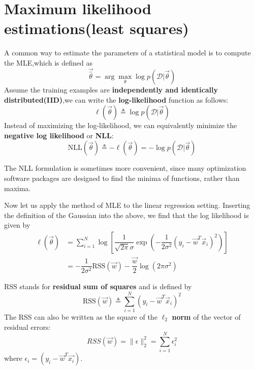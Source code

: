 \section{Maximum likelihood estimations(least squares)}
A common way to estimate the parameters of a statistical model is to compute the MLE,which is defined as
\begin{equation}
	\vec{\hat{\theta}}=\arg\max_\theta{\log p(\mathcal{D}|\vec{\theta})}
\end{equation}
Assume the training examples are \textbf{independently and identically distributed(IID)},we can write the \textbf{log-likelihood} function as follows:
\begin{equation}
\ell(\vec{\theta}) \triangleq \log p(\mathcal{D}|\vec{\theta})
\end{equation}
Instead of maximizing the log-likelihood, we can equivalently minimize the \textbf{negative log likelihood} or \textbf{NLL}:
\begin{equation}
\text{NLL}(\vec{\theta}) \triangleq -\ell(\vec{\theta})=-\log p(\mathcal{D}|\vec{\theta})
\end{equation}

The NLL formulation is sometimes more convenient, since many optimization software packages are designed to find the minima of functions, rather than maxima.

Now let us apply the method of MLE to the linear regression setting. Inserting the definition of the Gaussian into the above, we find that the log likelihood is given by
\begin{align}
\ell(\vec{\theta})& =\sum\limits_{i=1}^N \log\left[\dfrac{1}{\sqrt{2\pi}\sigma}\exp\left(-\dfrac{1}{2\sigma^2}(y_i-\vec{w}^T\vec{x}_i)^2\right)\right] \\
     & =-\dfrac{1}{2\sigma^2}\text{RSS}(\vec{w})-\dfrac{\vec{w}}{2}\log(2\pi\sigma^2)
\end{align}

RSS stands for \textbf{residual sum of squares} and is defined by
\begin{equation}
\text{RSS}(\vec{w}) \triangleq \sum\limits_{i=1}^N (y_i-\vec{w}^T\vec{x}_i)^2
\end{equation}
The RSS can also be written as the square of the $\ell_2$ \textbf{norm} of the vector of residual errors:
\begin{equation}
RSS(\vec{w}) = \parallel\epsilon\parallel_2^2 = \sum_{i=1}^{N}\epsilon_i^2
\end{equation}
where $\epsilon_i = (y_i - \vec{w}^T\vec{x_i})$.

